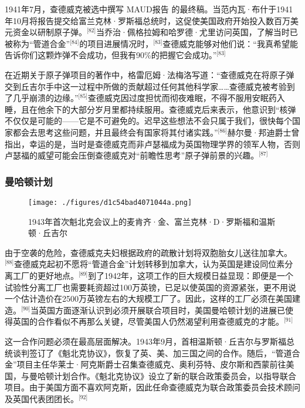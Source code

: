 1941年7月，查德威克被选中撰写 MAUD报告 的最终稿。当范内瓦·布什于1941年10月将报告提交给富兰克林·罗斯福总统时，这促使美国政府开始投入数百万美元资金以研制原子弹。\(^\text{[82]}\)当乔治·佩格拉姆和哈罗德·尤里访问英国，了解当时已被称为“管道合金”\(^\text{[84]}\)的项目进展情况时，\(^\text{[83]}\)查德威克能够对他们说：“我真希望能告诉你们这颗炸弹不会成功，但我有90\%的把握它会成功。”\(^\text{[83]}\)

在近期关于原子弹项目的著作中，格雷厄姆·法梅洛写道：“查德威克在将原子弹交到丘吉尔手中这一过程中所做的贡献超过任何其他科学家……查德威克被考验到了几乎崩溃的边缘。”\(^\text{[85]}\)查德威克因过度担忧而彻夜难眠，不得不服用安眠药入睡，且在他余下的大部分岁月里都持续服用。查德威克后来表示，他意识到“核弹不仅仅是可能的——它是不可避免的。迟早这些想法不会只属于我们，很快每个国家都会去思考这些问题，并且最终会有国家将其付诸实践。”\(^\text{[86]}\)赫尔曼·邦迪爵士曾指出，幸运的是，当时是查德威克而非卢瑟福成为英国物理学界的领军人物，否则卢瑟福的威望可能会压倒查德威克对“前瞻性思考”原子弹前景的兴趣。\(^\text{[87]}\)
\subsubsection{曼哈顿计划}
\begin{figure}[ht]
\centering
\texttt{[image: ./figures/d1c54bad4071044a.png]}
\caption{1943年首次魁北克会议上的麦肯齐·金、富兰克林·D·罗斯福和温斯顿·丘吉尔} \label{fig_ZMcdw_6}
\end{figure}
由于空袭的危险，查德威克夫妇根据政府的疏散计划将双胞胎女儿送往加拿大。\(^\text{[88]}\)查德威克起初不愿将“管道合金”计划转移到加拿大，认为英国是建设同位素分离工厂的更好地点。\(^\text{[89]}\)到了1942年，这项工作的巨大规模日益显现：即便是一个试验性分离工厂也需要耗资超过100万英镑，已足以使英国的资源紧张，更不用说一个估计造价在2500万英镑左右的大规模工厂了。因此，这样的工厂必须在美国建造。\(^\text{[90]}\)当英国方面逐渐认识到必须开展联合项目时，美国曼哈顿计划的进展已使得英国的合作看似不再那么关键，尽管美国人仍然渴望利用查德威克的才能。\(^\text{[91]}\)

这一合作问题必须在最高层面解决。1943年9月，首相温斯顿·丘吉尔与罗斯福总统谈判签订了《魁北克协议》，恢复了英、美、加三国之间的合作。随后，“管道合金”项目主任华莱士·阿克斯爵士召集查德威克、奥利芬特、皮尔斯和西蒙前往美国，与曼哈顿计划合作。《魁北克协议》设立了新的联合政策委员会，以指导联合项目。由于美国方面不喜欢阿克斯，因此任命查德威克为联合政策委员会技术顾问及英国代表团团长。\(^\text{[92]}\)

